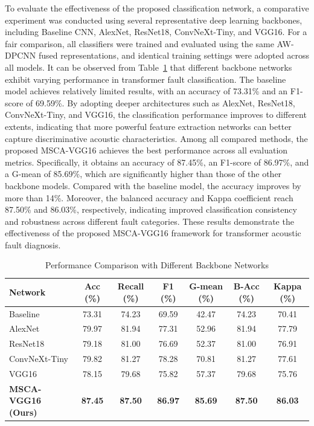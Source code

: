 \documentclass[journal]{IEEEtran}
\begin{document}
To evaluate the effectiveness of the proposed classification network, a comparative experiment was conducted using several representative deep learning backbones, including Baseline CNN, AlexNet, ResNet18, ConvNeXt-Tiny, and VGG16. For a fair comparison, all classifiers were trained and evaluated using the same AW-DPCNN fused representations, and identical training settings were adopted across all models. It can be observed from Table~\ref{tab:network_comparison} that different backbone networks exhibit varying performance in transformer fault classification. The baseline model achieves relatively limited results, with an accuracy of 73.31\% and an F1-score of 69.59\%. By adopting deeper architectures such as AlexNet, ResNet18, ConvNeXt-Tiny, and VGG16, the classification performance improves to different extents, indicating that more powerful feature extraction networks can better capture discriminative acoustic characteristics. Among all compared methods, the proposed MSCA-VGG16 achieves the best performance across all evaluation metrics. Specifically, it obtains an accuracy of 87.45\%, an F1-score of 86.97\%, and a G-mean of 85.69\%, which are significantly higher than those of the other backbone models. Compared with the baseline model, the accuracy improves by more than 14\%. Moreover, the balanced accuracy and Kappa coefficient reach 87.50\% and 86.03\%, respectively, indicating improved classification consistency and robustness across different fault categories. These results demonstrate the effectiveness of the proposed MSCA-VGG16 framework for transformer acoustic fault diagnosis.
\begin{table}
	\centering
	\caption{Performance Comparison with Different Backbone Networks}
	\label{tab:network_comparison}
	\begin{tabular}{lcccccc}
		\toprule
		\textbf{Network} 
		& \textbf{Acc (\%)} 
		& \textbf{Recall (\%)} 
		& \textbf{F1 (\%)} 
		& \textbf{G-mean (\%)} 
		& \textbf{B-Acc (\%)} 
		& \textbf{Kappa (\%)} \\
		\midrule
		Baseline &73.31 &74.23 &69.59 &42.47 &74.23 &70.41 \\
		AlexNet &79.97 &81.94 &77.31 &52.96 &81.94 &77.79 \\
		ResNet18 &79.18 &81.00 &76.69 &52.37 &81.00 &76.91 \\
		ConvNeXt-Tiny &79.82 &81.27 &78.28 &70.81 &81.27 &77.61 \\
		VGG16 &78.15 &79.68 &75.82 &57.37 &79.68 &75.76 \\
		\textbf{MSCA-VGG16 (Ours)} 
		& \textbf{87.45} & \textbf{87.50} 
		& \textbf{86.97} & \textbf{85.69} 
		& \textbf{87.50} & \textbf{86.03} \\
		\bottomrule
	\end{tabular}
\end{table}
\end{document}
